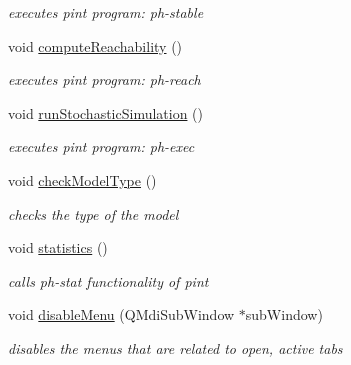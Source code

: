 \begin{DoxyCompactItemize}
\begin{DoxyCompactList}\small\item\em executes pint program\-: ph-\/stable \end{DoxyCompactList}\item 
\hypertarget{class_main_window_a0c7fe8e75bbc5113df5e514214908ab3}{void \hyperlink{class_main_window_a0c7fe8e75bbc5113df5e514214908ab3}{compute\-Reachability} ()}\label{class_main_window_a0c7fe8e75bbc5113df5e514214908ab3}

\begin{DoxyCompactList}\small\item\em executes pint program\-: ph-\/reach \end{DoxyCompactList}\item 
\hypertarget{class_main_window_ab8eeb1e902f4591fc2f35237a1faef01}{void \hyperlink{class_main_window_ab8eeb1e902f4591fc2f35237a1faef01}{run\-Stochastic\-Simulation} ()}\label{class_main_window_ab8eeb1e902f4591fc2f35237a1faef01}

\begin{DoxyCompactList}\small\item\em executes pint program\-: ph-\/exec \end{DoxyCompactList}\item 
\hypertarget{class_main_window_ace4bc6f63b25822514dd2250bbb4760f}{void \hyperlink{class_main_window_ace4bc6f63b25822514dd2250bbb4760f}{check\-Model\-Type} ()}\label{class_main_window_ace4bc6f63b25822514dd2250bbb4760f}

\begin{DoxyCompactList}\small\item\em checks the type of the model \end{DoxyCompactList}\item 
\hypertarget{class_main_window_a3eee76227ea883705553abe5e1f2a2be}{void \hyperlink{class_main_window_a3eee76227ea883705553abe5e1f2a2be}{statistics} ()}\label{class_main_window_a3eee76227ea883705553abe5e1f2a2be}

\begin{DoxyCompactList}\small\item\em calls ph-\/stat functionality of pint \end{DoxyCompactList}\item 
void \hyperlink{class_main_window_a5f56ea1ee38eb16074e654b8bd52d072}{disable\-Menu} (\-Q\-Mdi\-Sub\-Window $\ast$sub\-Window)
\begin{DoxyCompactList}\small\item\em disables the menus that are related to open, active tabs \end{DoxyCompactList}\end{DoxyCompactItemize}
